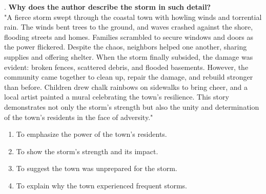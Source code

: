 \documentclass[12pt]{article}
\begin{document}
\vspace{1cm}
. \textbf{Why does the author describe the storm in such detail?\\}
"A fierce storm swept through the coastal town with howling winds and torrential rain. The winds bent trees to the ground, and waves crashed against the shore, flooding streets and homes. Families scrambled to secure windows and doors as the power flickered. Despite the chaos, neighbors helped one another, sharing supplies and offering shelter. When the storm finally subsided, the damage was evident: broken fences, scattered debris, and flooded basements. However, the community came together to clean up, repair the damage, and rebuild stronger than before. Children drew chalk rainbows on sidewalks to bring cheer, and a local artist painted a mural celebrating the town’s resilience. This story demonstrates not only the storm’s strength but also the unity and determination of the town’s residents in the face of adversity."\\
\begin{enumerate}[label=\Alph*.]
    \item To emphasize the power of the town’s residents.  
    \item To show the storm’s strength and its impact.  
    \item To suggest the town was unprepared for the storm.  
    \item To explain why the town experienced frequent storms.  
\end{enumerate}
\end{document}
